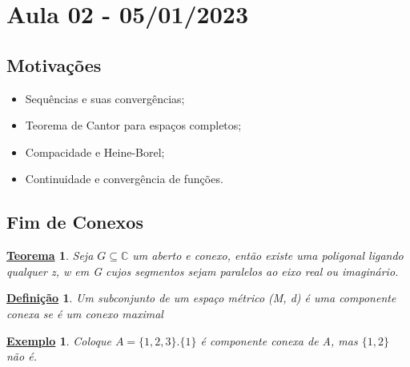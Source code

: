 \documentclass{article}
\newtheorem*{def*}{\underline{Defini\c c\~ao}}
\newtheorem*{theorem*}{\underline{Teorema}}
\newtheorem{example}{\underline{Exemplo}}[section]
\begin{document}
  \section{Aula 02 - 05/01/2023}
  \subsection{Motiva\c c\~oes}
  \begin{itemize}
    \item Sequ\^encias e suas converg\^encias;
    \item Teorema de Cantor para espa\c cos completos;
    \item Compacidade e Heine-Borel;
    \item Continuidade e converg\^encia de fun\c c\~oes.
  \end{itemize}

  \subsection{Fim de Conexos}
  \begin{theorem*}
    Seja $G\subseteq{\mathbb{C}}$ um aberto e conexo, ent\~ao existe uma poligonal ligando qualquer z, w em G cujos segmentos
    sejam paralelos ao eixo real ou imagin\'ario.
  \end{theorem*}

  \begin{def*}
    Um subconjunto de um espa\c co m\'etrico (M, d) \'e uma componente conexa se \'e um conexo maximal
  \end{def*}

  \begin{example}
    Coloque $A = \{1, 2, 3\}. \{1\}$ \'e componente conexa de A, mas $\{1, 2\}$ n\~ao \'e. 
  \end{example}
\end{document}
